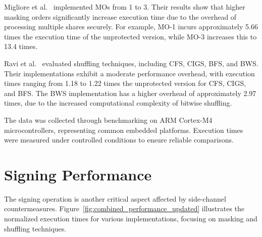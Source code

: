 Migliore et al.~\cite{Migliore19} implemented \acp{MO} from 1 to 3. Their results show that higher masking orders significantly increase execution time due to the overhead of processing multiple shares securely. For example, MO-1 incurs approximately 5.66 times the execution time of the unprotected version, while MO-3 increases this to 13.4 times.

Ravi et al.~\cite{Ravi20} evaluated shuffling techniques, including \ac{CFS}, \ac{CIGS}, \ac{BFS}, and \ac{BWS}. Their implementations exhibit a moderate performance overhead, with execution times ranging from 1.18 to 1.22 times the unprotected version for \ac{CFS}, \ac{CIGS}, and \ac{BFS}. The \ac{BWS} implementation has a higher overhead of approximately 2.97 times, due to the increased computational complexity of bitwise shuffling.

The data was collected through benchmarking on ARM Cortex-M4 microcontrollers, representing common embedded platforms. Execution times were measured under controlled conditions to ensure reliable comparisons.

\section{Signing Performance}

The signing operation is another critical aspect affected by side-channel countermeasures. Figure~\ref{fig:combined_performance_updated} illustrates the normalized execution times for various implementations, focusing on masking and shuffling techniques.

